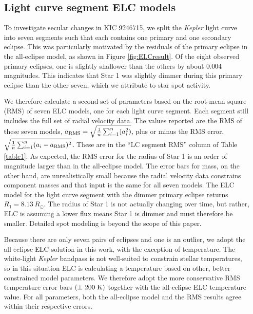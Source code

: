 \subsection{Light curve segment ELC models}\label{segment}
To investigate secular changes in KIC 9246715, we split the \emph{Kepler} light curve into seven segments such that each contains one primary and one secondary eclipse. This was particularly motivated by the residuals of the primary eclipse in the all-eclipse model, as shown in Figure \ref{fig:ELCresult}. Of the eight observed primary eclipses, one is slightly shallower than the others by about 0.004 magnitudes. This indicates that Star 1 was slightly dimmer during this primary eclipse than the other seven, which we attribute to star spot activity.

We therefore calculate a second set of parameters based on the root-mean-square (RMS) of seven ELC models, one for each light curve segment. Each segment still includes the full set of radial velocity data. The values reported are the RMS of these seven models, $a_{\rm{RMS}} = \sqrt{\frac{1}{n} \sum_{i=1}^n (a_i^2)}$, plus or minus the RMS error, $\sqrt{\frac{1}{n} \sum_{i=1}^n (a_i - a_{\rm{RMS}})^2}$. These are in the ``LC segment RMS'' column of Table \ref{table1}. As expected, the RMS error for the radius of Star 1 is an order of magnitude larger than in the all-eclipse model. The error bars for mass, on the other hand, are unrealistically small because the radial velocity data constrains component masses and that input is the same for all seven models. The ELC model for the light curve segment with the dimmer primary eclipse returns $R_1 = 8.13 \ R_{\odot}$. The radius of Star 1 is not actually changing over time, but rather, ELC is assuming a lower flux means Star 1 is dimmer and must therefore be smaller. Detailed spot modeling is beyond the scope of this paper.

Because there are only seven pairs of eclipses and one is an outlier, we adopt the all-eclipse ELC solution in this work, with the exception of temperature. The white-light \emph{Kepler} bandpass is not well-suited to constrain stellar temperatures, so in this situation ELC is calculating a temperature based on other, better-constrained model parameters. We therefore adopt the more conservative RMS temperature error bars $(\pm ~200 \ \rm{K})$ together with the all-eclipse ELC temperature value. For all parameters, both the all-eclipse model and the RMS results agree within their respective errors.

  
  
  